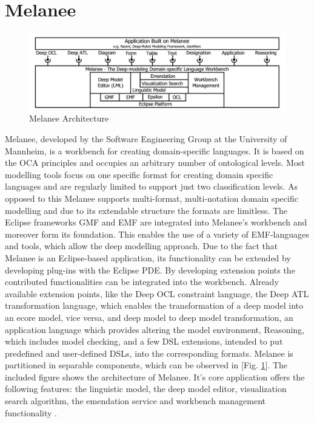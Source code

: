\section{Melanee}
\begin{figure}
	\centering
	\includegraphics[width=425pt]{grafiken/extensionPoint.png}
	\caption{Melanee Architecture\cite{AtkinsonG16}}
	\label{fig:2}
\end{figure}
Melanee, developed by the Software Engineering Group at the University of Mannheim, is a workbench for creating domain-specific languages. It is based on the OCA principles and occupies an arbitrary number of ontological levels. \cite{MEL}  Most modelling tools focus on one specific format for creating domain specific languages and are regularly limited to support just two classification levels. As opposed to this Melanee supports multi-format, multi-notation domain specific modelling and due to its extendable structure the formats are limitless. The Eclipse frameworks GMF and EMF are integrated into Melanee's workbench and moreover form its foundation. This enables the use of a variety of EMF-languages and tools, which allow the deep modelling approach. Due to the fact that Melanee is an Eclipse-based application, its functionality can be extended by developing plug-ins with the Eclipse PDE. By developing extension points the contributed functionalities can be integrated into the workbench. Already available extension points, like the Deep OCL constraint language, the Deep ATL transformation language, which enables the transformation of a deep model into an ecore model, vice versa, and deep model to deep model transformation, an application language which provides altering the model environment, Reasoning, which includes model checking, and a few DSL extensions, intended to put predefined and user-defined DSLs, into the corresponding formats. Melanee is partitioned in separable components, which can be observed in [Fig. \ref{fig:2}]. The included figure shows the architecture of Melanee. It's core application offers the following features: the linguistic model, the deep model editor, visualization search algorithm, the emendation service and workbench management functionality \cite{AtkinsonG16}.

